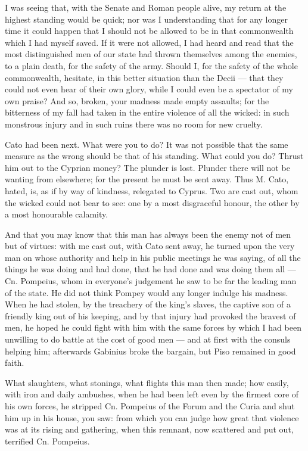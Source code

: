  I was seeing that, with the Senate and Roman people alive, my return at the highest standing would be quick; nor was I understanding that for any longer time it could happen that I should not be allowed to be in that commonwealth which I had myself saved. If it were not allowed, I had heard and read that the most distinguished men of our state had thrown themselves among the enemies, to a plain death, for the safety of the army. Should I, for the safety of the whole commonwealth, hesitate, in this better situation than the Decii --- that they could not even hear of their own glory, while I could even be a spectator of my own praise? And so, broken, your madness made empty assaults; for the bitterness of my fall had taken in the entire violence of all the wicked: in such monstrous injury and in such ruins there was no room for new cruelty.

 Cato had been next. What were you to do? It was not possible that the same measure as the wrong should be that of his standing. What could you do? Thrust him out to the Cyprian money? The plunder is lost. Plunder there will not be wanting from elsewhere; for the present he must be sent away. Thus M. Cato, hated, is, as if by way of kindness, relegated to Cyprus. Two are cast out, whom the wicked could not bear to see: one by a most disgraceful honour, the other by a most honourable calamity.

 And that you may know that this man has always been the enemy not of men but of virtues: with me cast out, with Cato sent away, he turned upon the very man on whose authority and help in his public meetings he was saying, of all the things he was doing and had done, that he had done and was doing them all --- Cn. Pompeius, whom in everyone's judgement he saw to be far the leading man of the state. He did not think Pompey would any longer indulge his madness. When he had stolen, by the treachery of the king's slaves, the captive son of a friendly king out of his keeping, and by that injury had provoked the bravest of men, he hoped he could fight with him with the same forces by which I had been unwilling to do battle at the cost of good men --- and at first with the consuls helping him; afterwards Gabinius broke the bargain, but Piso remained in good faith.

 What slaughters, what stonings, what flights this man then made; how easily, with iron and daily ambushes, when he had been left even by the firmest core of his own forces, he stripped Cn. Pompeius of the Forum and the Curia and shut him up in his house, you saw: from which you can judge how great that violence was at its rising and gathering, when this remnant, now scattered and put out, terrified Cn. Pompeius.

